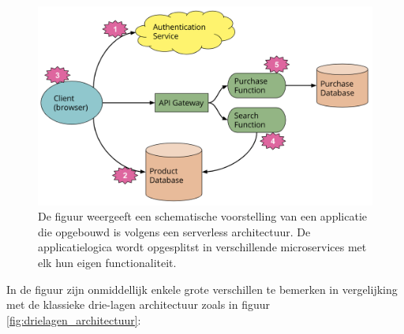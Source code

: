 \begin{figure}
    \includegraphics[width=1\textwidth]{img/serverless_architectuur.png}
    \caption{De figuur weergeeft een schematische voorstelling van een applicatie die opgebouwd is volgens een serverless architectuur. De applicatielogica wordt opgesplitst in verschillende microservices met elk hun eigen functionaliteit. \autocite{Roberts2018}} 
    \label{fig:serverless_architectuur}  
\end{figure}
In de figuur zijn onmiddellijk enkele grote verschillen te bemerken in vergelijking met de klassieke drie-lagen architectuur zoals in figuur \ref{fig:drielagen_architectuur}:
